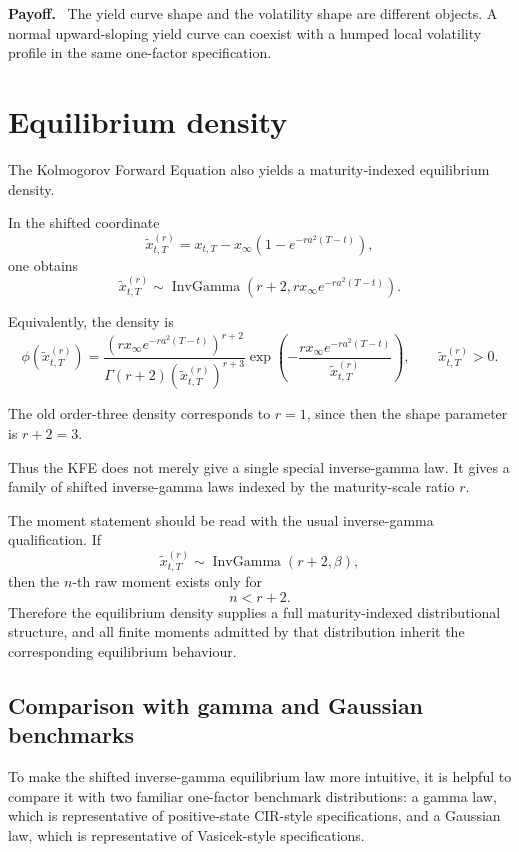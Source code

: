 \documentclass[11pt]{article}
\theoremstyle{plainbreak}
\newenvironment{takeaway}{%
    \vspace{0.4em}\noindent\textbf{Payoff.}\ }{\par\vspace{0.4em}}
\begin{document}
\begin{takeaway}
The yield curve shape and the volatility shape are different objects. A normal upward-sloping yield curve can coexist with a humped local volatility profile in the same one-factor specification.
\end{takeaway}

\section{Equilibrium density}

The Kolmogorov Forward Equation also yields a maturity-indexed equilibrium density.

In the shifted coordinate
\[
\widetilde{x}^{(r)}_{t,T}
=
x_{t,T}
-
x_\infty\left(1-e^{-ra^2(T-t)}\right),
\]
one obtains
\[
\widetilde{x}^{(r)}_{t,T}
\sim
\operatorname{InvGamma}
\left(
r+2,
rx_\infty e^{-ra^2(T-t)}
\right).
\]

Equivalently, the density is
\[
\phi(\widetilde{x}^{(r)}_{t,T})
=
\frac{
\left(rx_\infty e^{-ra^2(T-t)}\right)^{r+2}
}{
\Gamma(r+2)
\left(\widetilde{x}^{(r)}_{t,T}\right)^{r+3}
}
\exp\left(
-
\frac{rx_\infty e^{-ra^2(T-t)}}{\widetilde{x}^{(r)}_{t,T}}
\right),
\qquad \widetilde{x}^{(r)}_{t,T}>0.
\]

The old order-three density corresponds to \(r=1\), since then the shape parameter is \(r+2=3\).

Thus the KFE does not merely give a single special inverse-gamma law. It gives a family of shifted inverse-gamma laws indexed by the maturity-scale ratio \(r\).

The moment statement should be read with the usual inverse-gamma qualification. If
\[
\widetilde{x}^{(r)}_{t,T}\sim \operatorname{InvGamma}(r+2,\beta),
\]
then the \(n\)-th raw moment exists only for
\[
n<r+2.
\]
Therefore the equilibrium density supplies a full maturity-indexed distributional structure, and all finite moments admitted by that distribution inherit the corresponding equilibrium behaviour.

\subsection{Comparison with gamma and Gaussian benchmarks}

To make the shifted inverse-gamma equilibrium law more intuitive, it is helpful to compare it with two familiar one-factor benchmark distributions: a gamma law, which is representative of positive-state CIR-style specifications, and a Gaussian law, which is representative of Vasicek-style specifications.
\end{document}
